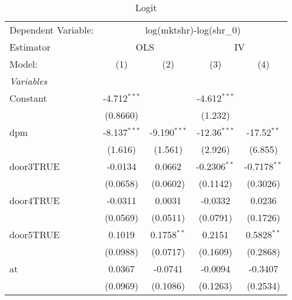 
\begin{table}[htbp]
   \caption{Logit}
   \centering
   \begin{tabular}{lcccc}
      \tabularnewline \midrule \midrule
      Dependent Variable: & \multicolumn{4}{c}{log(mktshr)-log(shr\_0)}\\
      Estimator & \multicolumn{2}{c}{OLS} & \multicolumn{2}{c}{IV} \\ 
      Model:                                     & (1)             & (2)                    & (3)                    & (4)\\  
      \midrule
      \emph{Variables}\\
      Constant                                   & -4.712$^{***}$  &                        & -4.612$^{***}$         &   \\   
                                                 & (0.8660)        &                        & (1.232)                &   \\   
      dpm                                        & -8.137$^{***}$  & -9.190$^{***}$         & -12.36$^{***}$         & -17.52$^{**}$\\   
                                                 & (1.616)         & (1.561)                & (2.926)                & (6.855)\\   
      door3TRUE                                  & -0.0134         & 0.0662                 & -0.2306$^{**}$         & -0.7178$^{**}$\\   
                                                 & (0.0658)        & (0.0602)               & (0.1142)               & (0.3026)\\   
      door4TRUE                                  & -0.0311         & 0.0031                 & -0.0332                & 0.0236\\   
                                                 & (0.0569)        & (0.0511)               & (0.0791)               & (0.1726)\\   
      door5TRUE                                  & 0.1019          & 0.1758$^{**}$          & 0.2151                 & 0.5828$^{**}$\\   
                                                 & (0.0988)        & (0.0717)               & (0.1609)               & (0.2868)\\   
      at                                         & 0.0367          & -0.0741                & -0.0094                & -0.3407\\   
                                                 & (0.0969)        & (0.1086)               & (0.1263)               & (0.2534)\\   

\end{tabular}
\end{table}
